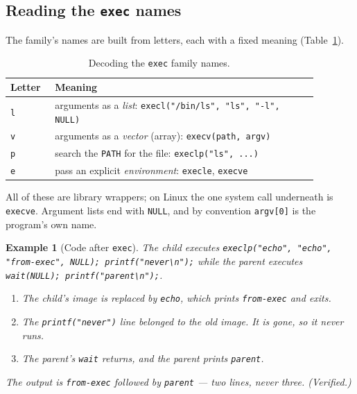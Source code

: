 \documentclass[11pt]{article}
\newtheorem{example}{Example}
\begin{document}
\subsection{Reading the \texttt{exec} names}

The family's names are built from letters, each with a fixed meaning
(Table~\ref{tab:exec}).

\begin{table}[h]
\centering
\renewcommand{\arraystretch}{1.3}
\begin{tabular}{@{}p{0.12\linewidth}p{0.76\linewidth}@{}}
\toprule
\textbf{Letter} & \textbf{Meaning} \\
\midrule
\texttt{l} & arguments as a \emph{list}: \texttt{execl("/bin/ls", "ls", "-l", NULL)} \\
\texttt{v} & arguments as a \emph{vector} (array): \texttt{execv(path, argv)} \\
\texttt{p} & search the \texttt{PATH} for the file: \texttt{execlp("ls", ...)} \\
\texttt{e} & pass an explicit \emph{environment}: \texttt{execle}, \texttt{execve} \\
\bottomrule
\end{tabular}
\caption{Decoding the \texttt{exec} family names.}
\label{tab:exec}
\end{table}

\noindent All of these are library wrappers; on Linux the one system call
underneath is \texttt{execve}. Argument lists end with \texttt{NULL}, and by
convention \texttt{argv[0]} is the program's own name.

\begin{example}[Code after \texttt{exec}]
\label{ex:afterexec}
The child executes
\texttt{execlp("echo", "echo", "from-exec", NULL); printf("never\textbackslash n");}
while the parent executes \texttt{wait(NULL); printf("parent\textbackslash n");}.
\begin{enumerate}
  \item The child's image is replaced by \texttt{echo}, which prints
    \texttt{from-exec} and exits.
  \item The \texttt{printf("never")} line belonged to the old image. It is
    gone, so it never runs.
  \item The parent's \texttt{wait} returns, and the parent prints
    \texttt{parent}.
\end{enumerate}
The output is \texttt{from-exec} followed by \texttt{parent} --- two lines,
never three. (Verified.)
\end{example}
\end{document}
